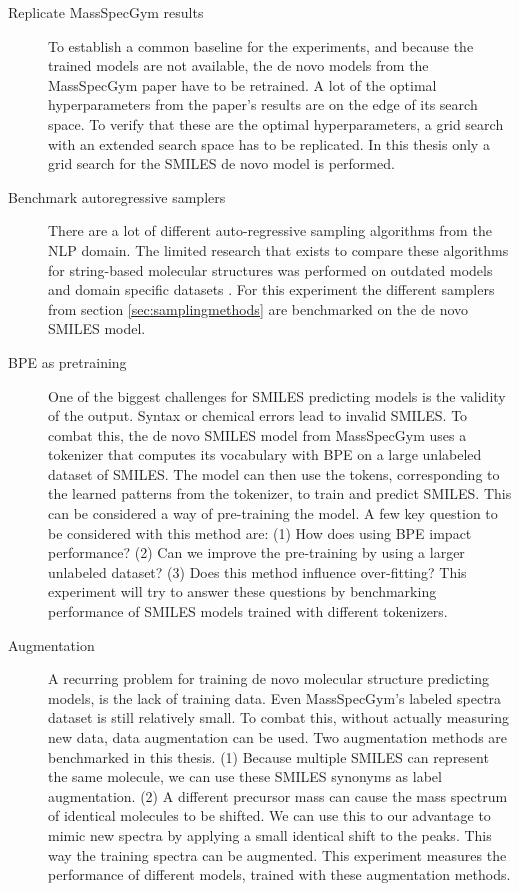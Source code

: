 \begin{description}
    \item[Replicate MassSpecGym results]
    To establish a common baseline for the experiments, and because the trained models are not available, the de novo models from the MassSpecGym paper \cite{bushuiev2024massspecgym} have to be retrained.
    A lot of the optimal hyperparameters from the paper's results are on the edge of its search space.
    To verify that these are the optimal hyperparameters, a grid search with an extended search space has to be replicated.
    In this thesis only a grid search for the SMILES de novo model is performed.
    
    \item[Benchmark autoregressive samplers]
    There are a lot of different auto-regressive sampling algorithms from the \ac{NLP} domain.
    The limited research that exists to compare these algorithms for string-based molecular structures was performed on outdated models and domain specific datasets \cite{stravs2022msnovelist}.
    For this experiment the different samplers from section \ref{sec:samplingmethods} are benchmarked on the de novo SMILES model.
    
    \item[\acf{BPE} as pretraining]
    One of the biggest challenges for SMILES predicting models is the validity of the output. Syntax or chemical errors lead to invalid SMILES.
    To combat this, the de novo SMILES model from MassSpecGym uses a tokenizer that computes its vocabulary with \ac{BPE} on a large unlabeled dataset of SMILES.
    The model can then use the tokens, corresponding to the learned patterns from the tokenizer, to train and predict SMILES.
    This can be considered a way of pre-training the model.
    A few key question to be considered with this method are: 
    (1) How does using \ac{BPE} impact performance?
    (2) Can we improve the pre-training by using a larger unlabeled dataset?
    (3) Does this method influence over-fitting?
    This experiment will try to answer these questions by benchmarking performance of SMILES models trained with different tokenizers.

    \item[Augmentation]
    A recurring problem for training de novo molecular structure predicting models, is the lack of training data.
    Even MassSpecGym's labeled spectra dataset is still relatively small.
    To combat this, without actually measuring new data, data augmentation can be used. 
    Two augmentation methods are benchmarked in this thesis.
    (1) Because multiple SMILES can represent the same molecule, we can use these SMILES synonyms as label augmentation.
    (2) A different precursor mass can cause the mass spectrum of identical molecules to be shifted.
    We can use this to our advantage to mimic new spectra by applying a small identical shift to the peaks.
    This way the training spectra can be augmented.
    This experiment measures the performance of different models, trained with these augmentation methods.


\end{description}
